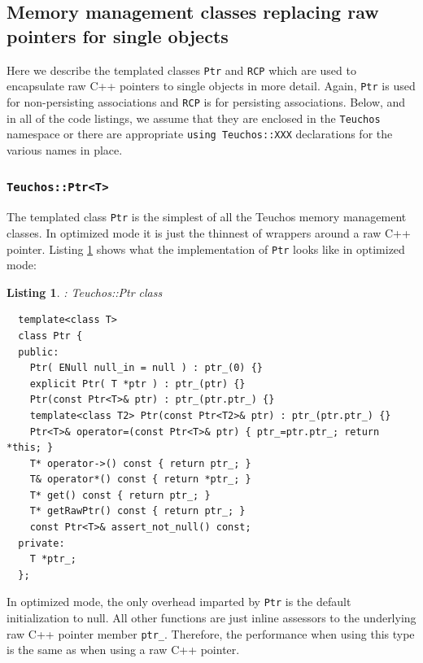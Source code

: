 \documentclass[pdf,ps2pdf,11pt]{SANDreport}
\newtheorem{listing}{Listing}
\begin{document}
%
{}\subsection{Memory management classes replacing raw pointers for
single objects}
%

Here we describe the templated classes {}\texttt{Ptr} and
{}\texttt{RCP} which are used to encapsulate raw C++ pointers to
single objects in more detail.  Again, {}\texttt{Ptr} is used for
non-persisting associations and {}\texttt{RCP} is for persisting
associations.  Below, and in all of the code listings, we assume that
they are enclosed in the {}\texttt{Teuchos} namespace or there are
appropriate {}\texttt{using Teuchos::XXX} declarations for the various
names in place.

%
{}\subsubsection{\texttt{Teuchos::Ptr<T>}}
%

The templated class {}\texttt{Ptr} is the simplest of all the Teuchos
memory management classes.  In optimized mode it is just the thinnest
of wrappers around a raw C++ pointer.  Listing {}\ref{listing:Ptr}
shows what the implementation of {}\texttt{Ptr} looks like in
optimized mode:

\begin{listing}: Teuchos::Ptr class\\
\label{listing:Ptr}
{\small\begin{verbatim}
  template<class T>
  class Ptr {
  public:
    Ptr( ENull null_in = null ) : ptr_(0) {}
    explicit Ptr( T *ptr ) : ptr_(ptr) {}
    Ptr(const Ptr<T>& ptr) : ptr_(ptr.ptr_) {}
    template<class T2> Ptr(const Ptr<T2>& ptr) : ptr_(ptr.ptr_) {}
    Ptr<T>& operator=(const Ptr<T>& ptr) { ptr_=ptr.ptr_; return *this; }
    T* operator->() const { return ptr_; }
    T& operator*() const { return *ptr_; }
    T* get() const { return ptr_; }
    T* getRawPtr() const { return ptr_; }
    const Ptr<T>& assert_not_null() const;
  private:
    T *ptr_;
  };
\end{verbatim}}
\end{listing}

In optimized mode, the only overhead imparted by {}\texttt{Ptr} is the
default initialization to null.  All other functions are just inline
assessors to the underlying raw C++ pointer member {}\texttt{ptr\_}.
Therefore, the performance when using this type is the same as when
using a raw C++ pointer.
\end{document}
